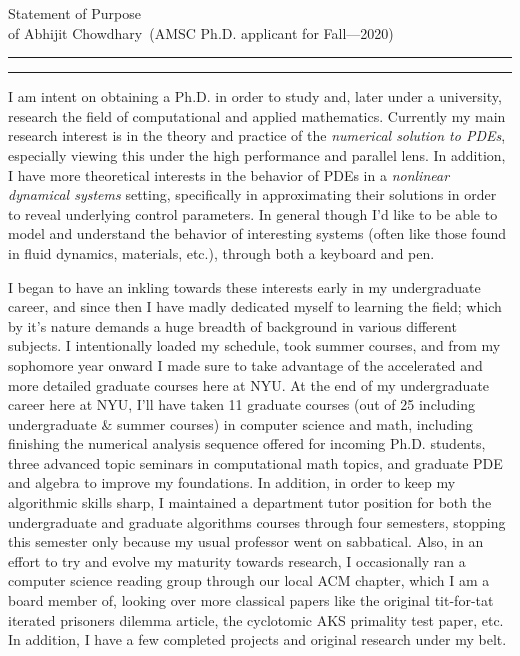 \documentclass[11pt]{article}
\newcommand{\soptitle}{Statement of Purpose}
\newcommand{\yourname}{Abhijit Chowdhary}
\begin{document}
\begin{center}\LARGE\soptitle\\
\large of \yourname\ (AMSC Ph.D. applicant for Fall---2020)
\end{center}

\hrule
\vspace{1pt}
\hrule height 1pt

\bigskip

I am intent on obtaining a Ph.D. in order to study and, later under
a university, research the field of computational and applied mathematics.
Currently my main research interest is in the theory and practice of the {\em
numerical solution to PDEs}, especially viewing this under the high performance
and parallel lens. In addition, I have more theoretical interests in the
behavior of PDEs in a {\em nonlinear dynamical systems} setting, specifically in
approximating their solutions in order to reveal underlying control parameters.
In general though I'd like to be able to model and understand the behavior of
interesting systems (often like those found in fluid dynamics, materials, etc.),
through both a keyboard and pen.

I began to have an inkling towards these interests early in my undergraduate
career, and since then I have madly dedicated myself to learning the field;
which by it's nature demands a huge breadth of background in various different
subjects. I intentionally loaded my schedule, took summer courses, and from my
sophomore year onward I made sure to take advantage of the accelerated and more
detailed graduate courses here at NYU. At the end of my undergraduate career
here at NYU, I'll have taken 11 graduate courses (out of 25 including
undergraduate \& summer courses) in computer science and math, including
finishing the numerical analysis sequence offered for incoming Ph.D. students,
three advanced topic seminars in computational math topics, and graduate PDE and
algebra to improve my foundations. In addition, in order to keep my algorithmic
skills sharp, I maintained a department tutor position for both the
undergraduate and graduate algorithms courses through four semesters, stopping
this semester only because my usual professor went on sabbatical. Also, in an
effort to try and evolve my maturity towards research, I occasionally ran
a computer science reading group through our local ACM chapter, which I am
a board member of, looking over more classical papers like the original
tit-for-tat iterated prisoners dilemma article, the cyclotomic AKS primality
test paper, etc. In addition, I have a few completed projects and original
research under my belt.
\end{document}
